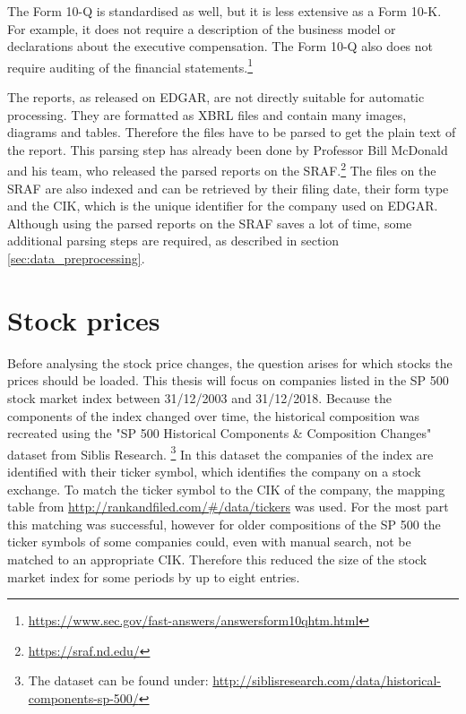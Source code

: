 The Form 10-Q is standardised as well, but it is less extensive as a Form 10-K.
For example, it does not require a description of the business model or declarations about the executive compensation.
The Form 10-Q also does not require auditing of the financial statements.\footnote{\url{https://www.sec.gov/fast-answers/answersform10qhtm.html}}

The reports, as released on \ac{EDGAR}, are not directly suitable for automatic processing.
They are formatted as \ac{XBRL} files and contain many images, diagrams and tables.
Therefore the files have to be parsed to get the plain text of the report.
This parsing step has already been done by Professor Bill McDonald and his team, who released the parsed reports on the \ac{SRAF}.\footnote{\url{https://sraf.nd.edu/}}
The files on the \ac{SRAF} are also indexed and can be retrieved by their filing date, their form type and the \ac{CIK}, which is the unique identifier for the company used on \ac{EDGAR}.
Although using the parsed reports on the \ac{SRAF} saves a lot of time, some additional parsing steps are required, as described in section \ref{sec:data_preprocessing}.


\section{Stock prices}

Before analysing the stock price changes, the question arises for which stocks the prices should be loaded.
This thesis will focus on companies listed in the \ac{SP} 500 stock market index between 31/12/2003 and 31/12/2018.
Because the components of the index changed over time, the historical composition was recreated using the "\ac{SP} 500 Historical Components \& Composition Changes" dataset from Siblis Research. \footnote{The dataset can be found under: \url{http://siblisresearch.com/data/historical-components-sp-500/}}
In this dataset the companies of the index are identified with their ticker symbol, which identifies the company on a stock exchange.
To match the ticker symbol to the \ac{CIK} of the company, the mapping table from \url{http://rankandfiled.com/#/data/tickers} was used.
For the most part this matching was successful, however for older compositions of the \ac{SP} 500 the ticker symbols of some companies could, even with manual search, not be matched to an appropriate \ac{CIK}.
Therefore this reduced the size of the stock market index for some periods by up to eight entries.

